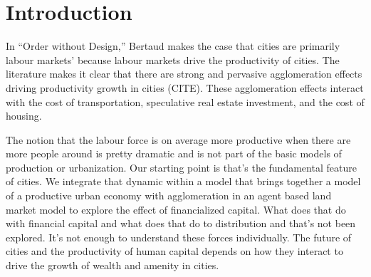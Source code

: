 \section{Introduction}
\label{Sec:Introduction}




In ``Order without Design,'' Bertaud makes the case that cities are primarily labour markets' because labour markets drive the productivity of cities. 
The literature makes it clear that there are strong and  pervasive agglomeration effects driving productivity growth in cities (CITE). %
These agglomeration effects interact with the cost of transportation, speculative real estate investment, and the cost of housing. 

The notion that the labour force is on average more productive when there are more people around is pretty dramatic and is not part of the basic models of production or urbanization. Our starting point is that's the fundamental feature of cities. 
We integrate that dynamic within a model that brings together a model of a productive urban economy with agglomeration in an agent based land market model to explore the effect of financialized capital.
What does that do with financial capital and what does that do to distribution and that's not been explored.
It's not enough to understand these forces individually.
The future of cities and the productivity of human capital depends on how they interact to drive the growth of wealth and amenity in cities. 

